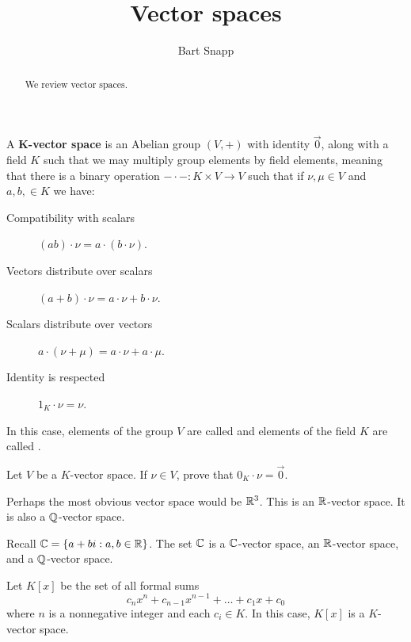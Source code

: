 \documentclass{ximera}
\author{Bart Snapp}
\title{Vector spaces}
\begin{document}
\begin{abstract}
  We review vector spaces.
\end{abstract}
\maketitle



\begin{definition}
  A \textbf{$\boldsymbol{K}$-vector space} is an Abelian group $(V,+)$
  with identity $\vec{0}$, along with a field $K$ such that we may
  multiply group elements by field elements, meaning that there is a
  binary operation $-\cdot-: K\times V \to V$ such that if $\nu,\mu\in
  V$ and $a,b,\in K$ we have:
\begin{description}
\item[Compatibility with scalars] $(ab)\cdot \nu = a\cdot (b\cdot \nu)$.
\item[Vectors distribute over scalars] $(a+b)\cdot \nu =
  a\cdot\nu + b\cdot \nu$.
\item[Scalars distribute over vectors] $a\cdot (\nu+\mu) =
  a\cdot \nu + a\cdot \mu$.
\item[Identity is respected] $1_K\cdot \nu = \nu$.
\end{description}
In this case, elements of the group $V$ are called  and
elements of the field $K$ are called .
\end{definition}


\begin{exercise}
  Let $V$ be a $K$-vector space. If $\nu\in V$, prove that
  $0_K\cdot \nu = \vec{0}$.
\end{exercise}


\begin{example}
  Perhaps the most obvious vector space would be $\mathbb R^3$. This is an
  $\mathbb R$-vector space. It is also a $\mathbb Q$-vector space.
\end{example}



\begin{example}
  Recall $\mathbb C = \{a+bi:a,b\in\mathbb R\}$. The set $\mathbb C$ is a $\mathbb C$-vector
  space, an $\mathbb R$-vector space, and a $\mathbb Q$-vector space.
\end{example}


\begin{example}[Polynomials]
  Let $K[x]$ be the set of all formal sums
  \[
  c_nx^n + c_{n-1}x^{n-1} + \dots + c_1 x + c_0
  \]
  where $n$ is a nonnegative integer and each $c_i \in K$. In this
  case, $K[x]$ is a $K$-vector space.
\end{example}
\end{document}
